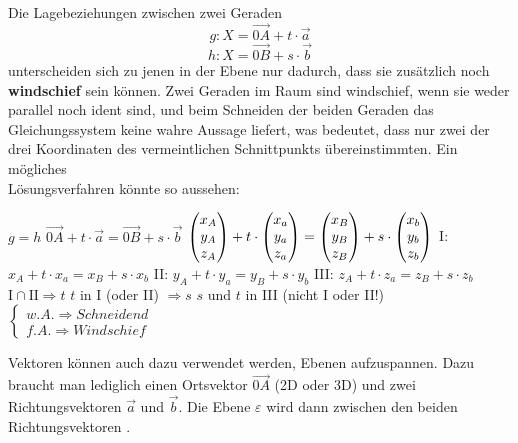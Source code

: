 \pagebreak


Die Lagebeziehungen zwischen zwei Geraden $$g: X = \vec{0A} + t \cdot \vec{a}$$ $$h: X = \vec{0B} + s \cdot \vec{b}$$ unterscheiden sich zu jenen in der Ebene nur dadurch, dass sie zus\"{a}tzlich noch \textbf{windschief} sein k\"{o}nnen. Zwei Geraden im Raum sind windschief, wenn sie weder parallel noch ident sind, und beim Schneiden der beiden Geraden das Gleichungssystem keine wahre Aussage liefert, was bedeutet, dass nur zwei der drei Koordinaten des vermeintlichen Schnittpunkts \"{u}bereinstimmten. Ein m\"{o}gliches \\ L\"{o}sungsverfahren k\"{o}nnte so aussehen:

\begin{center}
  $ g = h$
  \extrapar
  $ \vec{0A} + t \cdot \vec{a} = \vec{0B} + s \cdot \vec{b}$
  \extrapar
  $ \begin{pmatrix}x_{A}\\y_{A}\\z_{A}\end{pmatrix} + t \cdot \begin{pmatrix}x_{a}\\y_{a}\\z_{a}\end{pmatrix} = \begin{pmatrix}x_{B}\\y_{B}\\z_{B}\end{pmatrix} + s\cdot \begin{pmatrix}x_{b}\\y_{b}\\z_{b}\end{pmatrix}$
  \extrapar
  I: $x_{A} + t \cdot x_{a} = x_{B} + s \cdot x_{b}$
  \extrapar
  II: $y_{A} + t \cdot y_{a} = y_{B} + s \cdot y_{b}$
  \extrapar
  III: $z_{A} + t \cdot z_{a} = z_{B} + s \cdot z_{b}$
  \extrapar
  $\text{I} \cap \text{II} \Rightarrow t$
  \extrapar
  $t$ in I (oder II) $\Rightarrow s$
  \extrapar
  $s$ und $t$ in III (nicht I oder II!)
  $
  \begin{cases}
    w.A. \Rightarrow Schneidend\\
    f.A. \Rightarrow Windschief
  \end{cases}
  $
\end{center}

\pagebreak


Vektoren k\"{o}nnen auch dazu verwendet werden, Ebenen aufzuspannen. Dazu braucht man lediglich einen Ortsvektor $\vec{0A}$ (2D oder 3D) und zwei Richtungsvektoren $\vec{a}$ und $\vec{b}$. Die Ebene $\varepsilon$ wird dann zwischen den beiden Richtungsvektoren .

\begin{figure}[h!]
  \centering
  \large
\end{figure}

